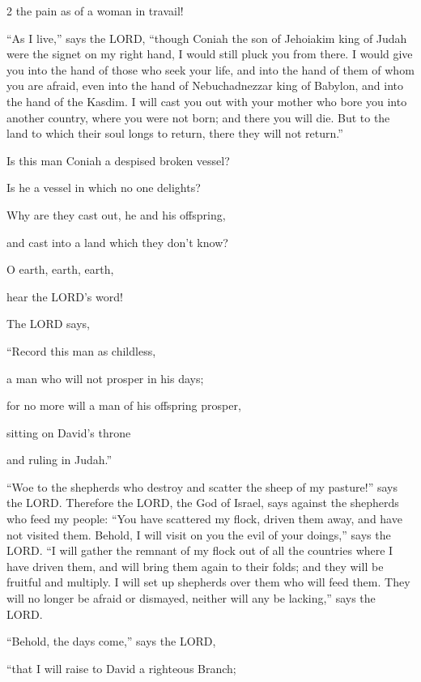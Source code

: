 \begin{multicols}{2}
the pain as of a woman in travail!


\myverse{}“As I live,” says the LORD, “though Coniah the son of Jehoiakim king of Judah were the signet on my right hand, I would still pluck you from there. \myverse{}I would give you into the hand of those who seek your life, and into the hand of them of whom you are afraid, even into the hand of Nebuchadnezzar king of Babylon, and into the hand of the Kasdim. \myverse{}I will cast you out with your mother who bore you into another country, where you were not born; and there you will die. \myverse{}But to the land to which their soul longs to return, there they will not return.”


\myverse{}Is this man Coniah a despised broken vessel?

Is he a vessel in which no one delights?

Why are they cast out, he and his offspring,

and cast into a land which they don’t know?


\myverse{}O earth, earth, earth,

hear the LORD’s word!


\myverse{}The LORD says,

“Record this man as childless,

a man who will not prosper in his days;

for no more will a man of his offspring prosper,

sitting on David’s throne

and ruling in Judah.”

\end{multicols}

\mychapter{} \myverse*{}“Woe to the shepherds who destroy and scatter the sheep of my pasture!” says the LORD. \myverse{}Therefore the LORD, the God of Israel, says against the shepherds who feed my people: “You have scattered my flock, driven them away, and have not visited them. Behold, I will visit on you the evil of your doings,” says the LORD. \myverse{}“I will gather the remnant of my flock out of all the countries where I have driven them, and will bring them again to their folds; and they will be fruitful and multiply. \myverse{}I will set up shepherds over them who will feed them. They will no longer be afraid or dismayed, neither will any be lacking,” says the LORD.


\myverse{}“Behold, the days come,” says the LORD,

“that I will raise to David a righteous Branch;

